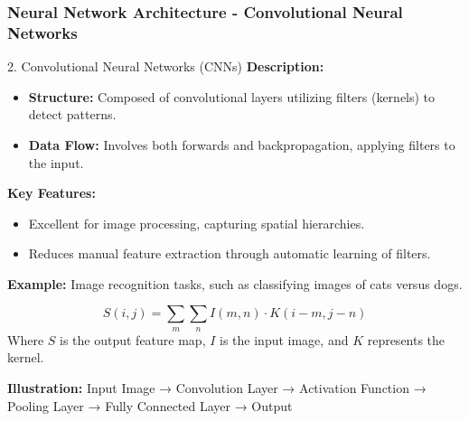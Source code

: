 \documentclass[aspectratio=169]{beamer}
\begin{document}
\begin{frame}[fragile]
  \frametitle{Neural Network Architecture - Convolutional Neural Networks}
  \begin{block}{2. Convolutional Neural Networks (CNNs)}
    \textbf{Description:}
    \begin{itemize}
      \item \textbf{Structure:} Composed of convolutional layers utilizing filters (kernels) to detect patterns.
      \item \textbf{Data Flow:} Involves both forwards and backpropagation, applying filters to the input.
    \end{itemize}

    \textbf{Key Features:}
    \begin{itemize}
      \item Excellent for image processing, capturing spatial hierarchies.
      \item Reduces manual feature extraction through automatic learning of filters.
    \end{itemize}

    \textbf{Example:} Image recognition tasks, such as classifying images of cats versus dogs.

    \begin{equation}
    S(i,j) = \sum_m \sum_n I(m,n) \cdot K(i-m, j-n)
    \end{equation}
    Where \( S \) is the output feature map, \( I \) is the input image, and \( K \) represents the kernel.

    \textbf{Illustration:} Input Image → Convolution Layer → Activation Function → Pooling Layer → Fully Connected Layer → Output
  \end{block}
\end{frame}
\end{document}
